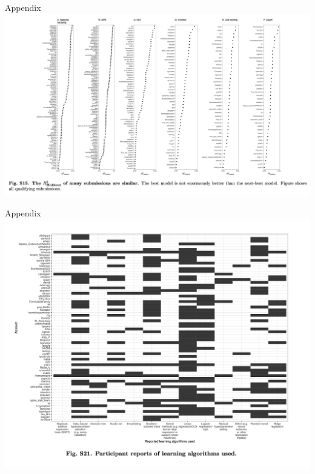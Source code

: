 \documentclass{beamer}
\begin{document}
\begin{frame}{Appendix}
\includegraphics[width = \textwidth]{figures/si_best_teams}
\end{frame}

\begin{frame}{Appendix}
\includegraphics[width = \textwidth]{figures/si_algorithms}
\end{frame}
\end{document}
